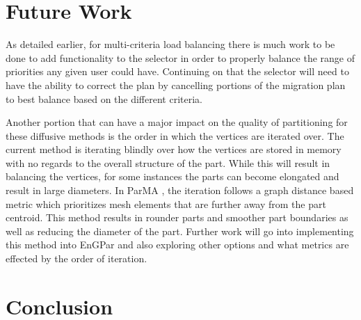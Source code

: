 \documentclass[a4paper]{article}
\begin{document}
\section{Future Work}
As detailed earlier, for multi-criteria load balancing there is much work to be done to add functionality to the selector in order to properly balance the range of priorities any given user could have. Continuing on that the selector will need to have the ability to correct the plan by cancelling portions of the migration plan to best balance based on the different criteria.

Another portion that can have a major impact on the quality of partitioning for these diffusive methods is the order in which the vertices are iterated over. The current method is iterating blindly over how the vertices are stored in memory with no regards to the overall structure of the part. While this will result in balancing the vertices, for some instances the parts can become elongated and result in large diameters. In ParMA \cite{SmithParma2015}, the iteration follows a graph distance based metric which prioritizes mesh elements that are further away from the part centroid. This method results in rounder parts and smoother part boundaries as well as reducing the diameter of the part. Further work will go into implementing this method into EnGPar and also exploring other options and what metrics are effected by the order of iteration.



\section{Conclusion}

\newpage 

\end{document}
